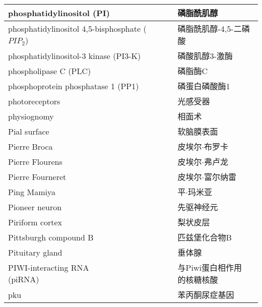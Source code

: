 \begin{longtable}{lll}
	\midrule
	phosphatidylinositol (PI)    && 磷脂酰肌醇   \\
	
	\midrule
	\makecell[l]{phosphatidylinositol \\ 4,5-bisphosphate ($ PIP_2 $)}    && 磷脂酰肌醇-4,5-二磷酸   \\
	
	\midrule
	phosphatidylinositol-3 kinase (PI3-K)   && 磷酸肌醇3-激酶   \\
	
	\midrule
	phospholipase C (PLC)     && 磷脂酶C   \\
	
	\midrule
	phosphoprotein phosphatase 1 (PP1)     && 磷蛋白磷酸酶1   \\
	
	\midrule
	photoreceptors     && 光感受器   \\
	
	\midrule
	physiognomy     && 相面术   \\
	
	\midrule
	Pial surface     && 软脑膜表面   \\
	
	\midrule
	Pierre Broca     && 皮埃尔$\cdot$布罗卡   \\
	
	\midrule
	Pierre Flourens     && 皮埃尔$\cdot$弗卢龙   \\
	
	\midrule
	Pierre Fourneret     && 皮埃尔$\cdot$富尔纳雷   \\
	
	\midrule
	Ping Mamiya     && 平$\cdot$玛米亚   \\
	
	\midrule
	Pioneer neuron     && 先驱神经元   \\
	
	\midrule
	Piriform cortex     && 梨状皮层   \\
	
	\midrule
	Pittsburgh compound B     && 匹兹堡化合物B   \\
	
	\midrule
	Pituitary gland     && 垂体腺   \\
	
	\midrule
	\makecell[l]{PIWI-interacting RNA \\ (piRNA) }  && \makecell[l]{与Piwi蛋白相作用\\的核糖核酸}   \\
	
	\midrule
	pku   && 苯丙酮尿症基因   \\
	

\end{longtable}
